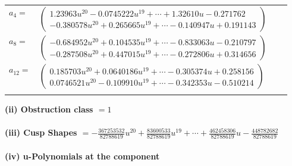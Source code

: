 \documentclass[1p]{elsarticle_modified}
\theoremstyle{definition}
\begin{document}
\begin{tabular}{m{7pt} m{180pt} m{7pt} m{180pt} }
\flushright $a_{4}=$&$\begin{pmatrix}1.23963 u^{20}-0.0745222 u^{19}+\cdots+1.32610 u-0.271762\\-0.380578 u^{20}+0.265665 u^{19}+\cdots-0.140947 u+0.191143\end{pmatrix}$ \\
\flushright $a_{8}=$&$\begin{pmatrix}-0.684952 u^{20}+0.104535 u^{19}+\cdots-0.833063 u-0.210797\\-0.287508 u^{20}+0.447015 u^{19}+\cdots-0.272806 u+0.314656\end{pmatrix}$ \\
\flushright $a_{12}=$&$\begin{pmatrix}0.185703 u^{20}+0.0640186 u^{19}+\cdots-0.305374 u+0.258156\\0.0746521 u^{20}-0.109910 u^{19}+\cdots-0.342353 u-0.510214\end{pmatrix}$\\&\end{tabular}
\flushleft \textbf{(ii) Obstruction class $= 1$}\\~\\
\flushleft \textbf{(iii) Cusp Shapes $= -\frac{367253532}{82788619} u^{20}+\frac{83600533}{82788619} u^{19}+\cdots+\frac{462458306}{82788619} u-\frac{448782682}{82788619}$}\\~\\
\newpage\renewcommand{\arraystretch}{1}
\flushleft \textbf{(iv) u-Polynomials at the component}\newline \\
\end{document}
